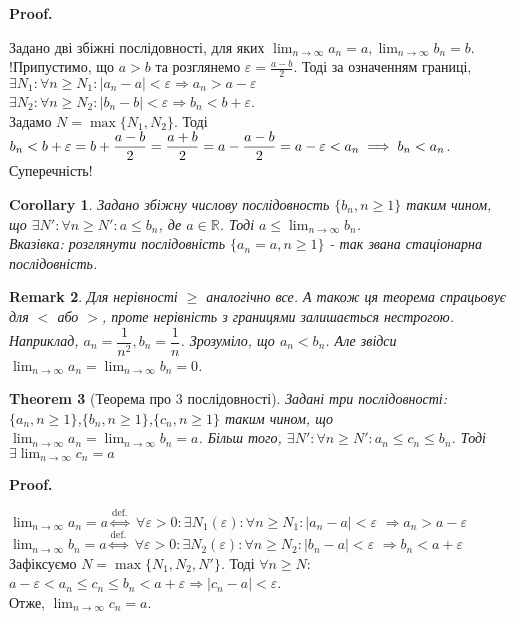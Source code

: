 \documentclass[a4paper, 14pt]{article}
\makeatletter
\def\qed{$\blacksquare$}
\theoremstyle{theoremdd}
\newtheorem{theorem}{Theorem}[subsection]
\theoremstyle{theoremdd}
\theoremstyle{theoremdd}
\theoremstyle{theoremdd}
\theoremstyle{theoremdd}
\theoremstyle{theoremdd}
\newtheorem{remark}[theorem]{Remark}
\theoremstyle{theoremdd}
\theoremstyle{theoremdd}
\newtheorem{corollary}[theorem]{Corollary}
\renewenvironment{proof}[1][Proof.\\]{\par
\pushQED{\hfill \qed}%
\normalfont \topsep6\p@\@plus6\p@\relax
\trivlist
\item\relax
{\bfseries
#1\@addpunct{.}}\hspace\labelsep\ignorespaces
}{%
\popQED\endtrivlist\@endpefalse
}
\makeatother
\begin{document}
	\begin{proof}
	Задано дві збіжні послідовності, для яких $\displaystyle \lim_{n \to \infty} a_n =a, \lim_{n \to \infty} b_n = b$.\\
	!Припустимо, що $a>b$ та розглянемо $\displaystyle \varepsilon = \frac{a-b}{2}$. Тоді за означенням границі,\\
	$\exists N_1: \forall n \geq N_1:|a_n-a|<\varepsilon \Rightarrow a_n>a-\varepsilon$\\
	$\exists N_2: \forall n \geq N_2:|b_n-b|<\varepsilon \Rightarrow b_n<b+\varepsilon$.\\
	Задамо $N=\max \{N_1, N_2\}$. Тоді  $\displaystyle b_n < b+\varepsilon = b + \frac{a-b}{2}=\frac{a+b}{2}=a-\frac{a-b}{2} = a-\varepsilon<a_n \\ \implies b_n<a_n$. Суперечність!
	\end{proof}
	
	\begin{corollary}
	Задано збіжну числову послідовность $\{b_n, n \geq 1\}$ таким чином, що $\exists N': \forall n \geq N': a \leq b_n$, де $a \in \mathbb{R}$. Тоді $\displaystyle a \leq \lim_{n \to \infty} b_n$.\\
	\textit{Вказівка: розглянути послідовність $\{a_n = a, n \geq 1\}$ - так звана стаціонарна послідовність.}
	\end{corollary}
	
	\begin{remark}
	Для нерівності $\geq$ аналогічно все. А також ця теорема спрацьовує для $<$ або $>$, проте нерівність з границями залишається нестрогою.\\
	Наприклад, $a_n = \dfrac{1}{n^2}, b_n = \dfrac{1}{n}$. Зрозуміло, що $a_n < b_n$. Але звідси $\displaystyle\lim_{n \to \infty} a_n = \displaystyle\lim_{n \to \infty} b_n = 0$.
	\end{remark}
	
	\begin{theorem}[Теорема про 3 послідовності]
	Задані три послідовності: $\{a_n, n \geq 1\}$,$\{b_n, n \geq 1\}$,$\{c_n, n \geq 1\}$ таким чином, що $\displaystyle \lim_{n \to \infty} a_n = \displaystyle \lim_{n \to \infty} b_n = a$. Більш того, $\exists N': \forall n \geq N': a_n \leq c_n \leq b_n$.
	Тоді $\exists \displaystyle \lim_{n \to \infty} c_n = a$
	\end{theorem}
	
	\begin{proof}
	$\displaystyle \lim_{n \to \infty} a_n = a \overset{\textrm{def.}}{\iff}$ $\forall \varepsilon > 0: \exists N_1(\varepsilon): \forall n \geq N_1: |a_n-a| < \varepsilon$ $\Rightarrow a_n > a - \varepsilon$\\
	$\displaystyle \lim_{n \to \infty} b_n = a \overset{\textrm{def.}}{\iff}$ $\forall \varepsilon > 0: \exists N_2(\varepsilon): \forall n \geq N_2: |b_n-a| < \varepsilon$ $\Rightarrow b_n<a+\varepsilon$\\
	Зафіксуємо $N=\max\{N_1, N_2, N'\}$. Тоді $\forall n \geq N:$\\
	$a-\varepsilon< a_n \leq c_n \leq b_n < a+\varepsilon \Rightarrow |c_n - a|<\varepsilon$.\\
	Отже, $\displaystyle \lim_{n \to \infty} c_n = a$.
	\end{proof}
	
\end{document}
